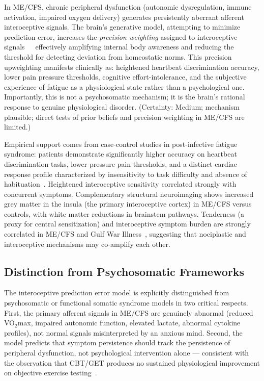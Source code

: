 \begin{hypothesis}
\label{hyp:ch15-interoceptive-error}
In ME/CFS, chronic peripheral dysfunction (autonomic dysregulation, immune activation, impaired oxygen delivery) generates persistently aberrant afferent interoceptive signals. The brain's generative model, attempting to minimize prediction error, increases the \emph{precision weighting} assigned to interoceptive signals~~~effectively amplifying internal body awareness and reducing the threshold for detecting deviation from homeostatic norms. This precision upweighting manifests clinically as: heightened heartbeat discrimination accuracy, lower pain pressure thresholds, cognitive effort-intolerance, and the subjective experience of fatigue as a physiological state rather than a psychological one. Importantly, this is not a psychosomatic mechanism; it is the brain's rational response to genuine physiological disorder. (Certainty: Medium; mechanism plausible; direct tests of prior beliefs and precision weighting in ME/CFS are limited.)
\end{hypothesis}

Empirical support comes from case-control studies in post-infective fatigue syndrome: patients demonstrate significantly higher accuracy on heartbeat discrimination tasks, lower pressure pain thresholds, and a distinct cardiac response profile characterized by insensitivity to task difficulty and absence of habituation~\cite{Kadota2010Interoception}. Heightened interoceptive sensitivity correlated strongly with concurrent symptoms. Complementary structural neuroimaging shows increased grey matter in the insula (the primary interoceptive cortex) in ME/CFS versus controls, with white matter reductions in brainstem pathways. Tenderness (a proxy for central sensitization) and interoceptive symptom burden are strongly correlated in ME/CFS and Gulf War Illness~\cite{Baraniuk2025NociplasticMECFS}, suggesting that nociplastic and interoceptive mechanisms may co-amplify each other.

\subsection{Distinction from Psychosomatic Frameworks}

The interoceptive prediction error model is explicitly distinguished from psychosomatic or functional somatic syndrome models in two critical respects. First, the primary afferent signals in ME/CFS are genuinely abnormal (reduced VO$_2$max, impaired autonomic function, elevated lactate, abnormal cytokine profiles), not normal signals misinterpreted by an anxious mind. Second, the model predicts that symptom persistence should track the persistence of peripheral dysfunction, not psychological intervention alone --- consistent with the observation that CBT/GET produces no sustained physiological improvement on objective exercise testing~\cite{keller2024cpet}.

